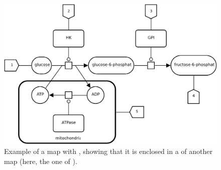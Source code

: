 \begin{figure}
\begin{center}
\includegraphics[scale=0.8]{images/build/submap_unfolded_example.pdf}
\caption{Example of a map with , showing that it is enclosed in a  of another map (here, the one of ).}
\label{fig:unfolded}
\end{center}
\end{figure}
